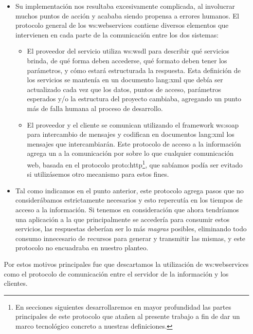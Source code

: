 \begin{itemize}
  \item Su implementación nos resultaba excesivamente complicada, al involucrar muchos puntos de acción y acababa siendo propensa a errores humanos. El protocolo general de los \glspl{ws:webservice} contiene diversos elementos que intervienen en cada parte de la comunicación entre los dos sistemas:
  \begin{itemize}
    \item El proveedor del servicio utiliza \gls{ws:wsdl} para describir qué servicios brinda, de qué forma deben accederse, qué formato deben tener los parámetros, y cómo estará estructurada la respuesta. Esta definición de los servicios se mantenía en un documento \gls{lang:xml} que debía ser actualizado cada vez que los datos, puntos de acceso, parámetros esperados y/o la estructura del proyecto cambiaba, agregando un punto más de falla humana al proceso de desarrollo.

    \item El proveedor y el cliente se comunican utilizando el framework \gls{ws:soap} para intercambio de mensajes y codifican en documentos \gls{lang:xml} los mensajes que intercambiarán. Este protocolo de acceso a la información agrega un  a la comunicación por sobre lo que cualquier comunicación web, basada en el protocolo \gls{proto:http}\footnote{En secciones siguientes desarrollaremos en mayor profundidad las partes principales de este protocolo que atañen al presente trabajo a fin de dar un marco tecnológico concreto a nuestras definiciones.}, que sabíamos podía ser evitado si utilizásemos otro mecanismo para estos fines.
  \end{itemize}

  \item Tal como indicamos en el punto anterior, este protocolo agrega pasos que no considerábamos estrictamente necesarios y esto repercutía en los tiempos de acceso a la información. Si tenemos en consideración que ahora tendríamos una aplicación a la que principalmente se accedería para consumir estos servicios, las respuestas deberían ser lo más \textit{magras} posibles, eliminando todo consumo innecesario de recursos para generar y transmitir las mismas, y este protocolo no encuadraba en nuestro planteo.
\end{itemize}

Por estos motivos principales fue que descartamos la utilización de \glspl{ws:webservice} como el protocolo de comunicación entre el servidor de la información y los clientes.

